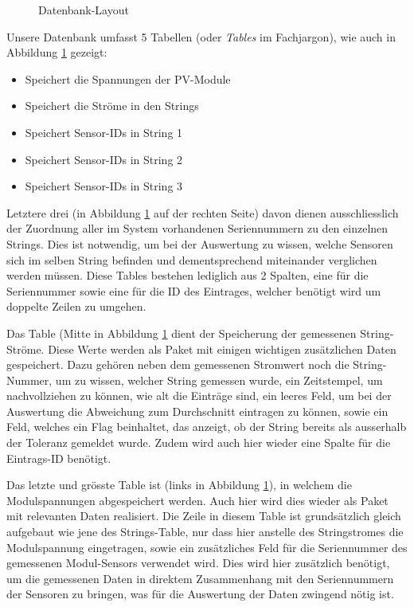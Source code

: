 \begin{figure}[h!tb]
    \centering
    
    \caption{Datenbank-Layout}
  \label{fig:database:layout}
\end{figure}


Unsere Datenbank  umfasst 5 Tabellen  (oder \emph{Tables} im  Fachjargon), wie
auch in Abbildung \ref{fig:database:layout} gezeigt:

\begin{itemize}
    \tightlist
    \item
         Speichert die Spannungen der PV-Module
    \item
         Speichert die Str\"ome in den Strings
    \item
         Speichert Sensor-IDs in String 1
    \item
         Speichert Sensor-IDs in String 2
    \item
         Speichert Sensor-IDs in String 3
\end{itemize}

Letztere drei  (in Abbildung \ref{fig:database:layout} auf  der rechten Seite)
davon  dienen  ausschliesslich  der  Zuordnung  aller  im  System  vorhandenen
Seriennummern  zu  den  einzelnen  Strings. Dies ist  notwendig,  um  bei  der
Auswertung  zu wissen,  welche Sensoren  sich  im selben  String befinden  und
dementsprechend miteinander verglichen  werden m\"ussen. Diese Tables bestehen
lediglich aus 2  Spalten, eine f\"ur die Seriennummer sowie  eine f\"ur die ID
des Eintrages, welcher ben\"otigt wird um doppelte Zeilen zu umgehen.

Das Table   (Mitte in Abbildung  \ref{fig:database:layout} dient
der Speicherung  der gemessenen String-Str\"ome. Diese Werte  werden als Paket
mit einigen  wichtigen zus\"atzlichen Daten gespeichert. Dazu  geh\"oren neben
dem gemessenen Stromwert noch die  String-Nummer, um zu wissen, welcher String
gemessen wurde,  ein Zeitstempel, um  nachvollziehen zu k\"onnen, wie  alt die
Eintr\"age  sind,  ein leeres  Feld,  um  bei  der Auswertung  die  Abweichung
zum  Durchschnitt eintragen  zu k\"onnen,  sowie  ein Feld,  welches ein  Flag
beinhaltet, das  anzeigt, ob  der String bereits  als ausserhalb  der Toleranz
gemeldet wurde. Zudem wird auch hier  wieder eine Spalte f\"ur die Eintrags-ID
ben\"otigt.

Das  letzte  und  gr\"osste  Table   ist    (links  in  Abbildung
\ref{fig:database:layout}),  in  welchem   die  Modulspannungen  abgespeichert
werden. Auch  hier   wird  dies   wieder  als   Paket  mit   relevanten  Daten
realisiert. Die  Zeile in  diesem Table  ist grunds\"atzlich  gleich aufgebaut
wie  jene  des  Strings-Table,  nur   dass  hier  anstelle  des  Stringstromes
die  Modulspannung  eingetragen,  sowie  ein  zus\"atzliches  Feld  f\"ur  die
Seriennummer  des  gemessenen  Modul-Sensors verwendet  wird. Dies  wird  hier
zus\"atzlich ben\"otigt, um die gemessenen Daten in  direktem Zusammenhang mit
den Seriennummern der Sensoren zu bringen,  was f\"ur die Auswertung der Daten
zwingend n\"otig ist.


